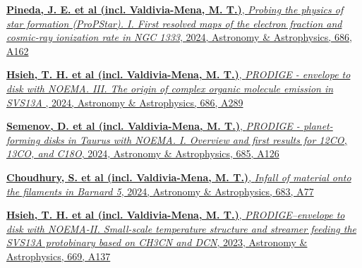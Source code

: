 \begin{cvparagraph}
\begin{cvitems}
	\item{\href{https://ui.adsabs.harvard.edu/abs/2024A%26A...686A.162P/abstract}{\textbf{Pineda, J. E. et al (incl. Valdivia-Mena, M. T.)}, \textit{Probing the physics of star formation (ProPStar). I. First resolved maps of the electron fraction and cosmic-ray ionization rate in NGC 1333}, 2024, Astronomy \& Astrophysics, 686, A162}}
	\item{\href{https://ui.adsabs.harvard.edu/abs/2024A%26A...686A.289H/abstract}{\textbf{Hsieh, T. H. et al (incl. Valdivia-Mena, M. T.)}, \textit{PRODIGE - envelope to disk with NOEMA. III. The origin of complex organic molecule emission in SVS13A }, 2024, Astronomy \& Astrophysics, 686, A289}}
	\item{\href{https://ui.adsabs.harvard.edu/abs/2024A%26A...685A.126S/abstract}{\textbf{Semenov, D. et al (incl. Valdivia-Mena, M. T.)}, \textit{PRODIGE - planet-forming disks in Taurus with NOEMA. I. Overview and first results for 12CO, 13CO, and C18O}, 2024, Astronomy \& Astrophysics,  685, A126}}
	\item{\href{https://ui.adsabs.harvard.edu/abs/2024A%26A...683A..77C/abstract}{\textbf{Choudhury, S. et al (incl. Valdivia-Mena, M. T.)}, \textit{Infall of material onto the filaments in Barnard 5}, 2024, Astronomy \& Astrophysics, 683, A77}}
	\item{\href{https://ui.adsabs.harvard.edu/abs/2023A%26A...669A.137H/abstract}{\textbf{Hsieh, T. H. et al (incl. Valdivia-Mena, M. T.)}, \textit{PRODIGE–envelope to disk with NOEMA-II. Small-scale temperature structure and streamer feeding the SVS13A protobinary based on CH3CN and DCN}, 2023, Astronomy \& Astrophysics, 669, A137}}
	
\end{cvitems}
\vspace{4pt}
\end{cvparagraph}


